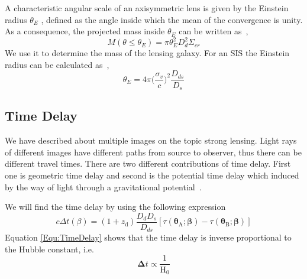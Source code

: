 \noindent
A characteristic angular scale of an axisymmetric lens is given by the Einstein radius $ \theta_{E} $ , defined as the angle inside which the mean of the convergence is unity. As a consequence, the projected mass inside $ \theta_{E} $ can be written as~\cite{manual},
\begin{equation}
M(\theta \le \theta_{E})=\pi \theta^2_{E}D^2_{d}\Sigma_{cr}
\label{math:projMass}
\end{equation}
\noindent
We use it to determine the mass of the lensing galaxy. For an SIS the Einstein radius can be calculated as~\cite{manual},
\begin{equation}
\theta_{E}=4\pi\bigg( \frac{\sigma_{v}}{c}\bigg)^2\frac{D_{ds}}{D_{s}}
\label{Equ:ThetaE}
\end{equation}

\subsection{Time Delay}
We have described about multiple images on the topic strong lensing. Light rays of different images have different paths from source to observer, thus there can be different travel times. There are two different contributions of time delay. First one is geometric time delay 
and second is the potential time delay which induced by the way of light through a gravitational potential~\cite{manual}.

We will find the time delay by using the following expression~\cite{manual}
\begin{equation}
c\Delta t(\beta)=(1+z_{\text{d}})\frac{{D}_{{d}}{D}_{{s}}}{{D}_{{ds}}}[\tau(\pmb\theta_{\text{A}}; \pmb\beta)-\tau(\pmb\theta_{\text{B}}; \pmb\beta)]
\label{Equ:TimeDelay}
\end{equation}
\noindent
Equation \ref{Equ:TimeDelay} shows that the time delay is inverse proportional to the Hubble constant, i.e.
\begin{equation}
\pmb\Delta t \propto \frac{1}{\text{H}_{0}}
\end{equation}


